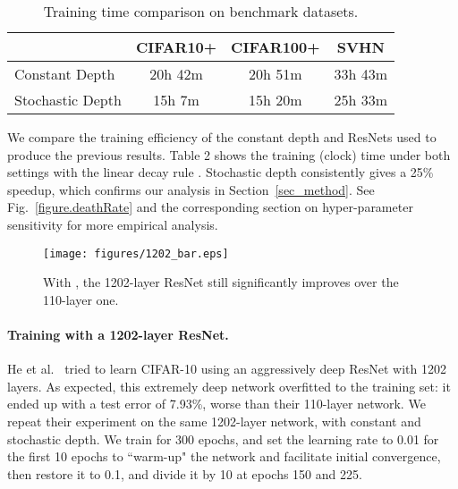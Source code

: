 \documentclass[runningheads]{llncs}
\begin{document}
\begin{table}[t!]
\label{table.training_time}
\caption{Training time comparison on benchmark datasets.}
\begin{center}
\resizebox{0.65\textwidth}{!}
{
\begin{small}
\begin{tabular}{lccc}
\hline
		  	& CIFAR10+   & CIFAR100+   & SVHN	\\
\hline
Constant Depth		
		    & 20h 42m    & 20h 51m	   & 33h 43m \\
Stochastic Depth
			& 15h 7m	 & 15h 20m	   & 25h 33m \\
\hline
\end{tabular}
\end{small}
}
\vspace{-5ex}
\end{center}
\end{table}  We compare the training efficiency of the constant depth and \name{} ResNets used to produce the previous results. Table 2 shows the training (clock) time under both settings with the linear decay rule . Stochastic depth consistently gives a 25\% speedup, which confirms our analysis in Section~\ref{sec_method}. See Fig.~\ref{figure.deathRate} and the corresponding section on hyper-parameter sensitivity for more empirical analysis. 

\begin{wrapfigure}{r}{0.5\textwidth}
	\vspace{-15ex}
	\begin{center}
		\texttt{[image: figures/1202\_bar.eps]}
	\end{center}
	\vspace{-10ex}
	\caption{With \name{}, the 1202-layer ResNet still significantly improves over the 110-layer one.}
	\vspace{-4ex}
	\label{figure.1202compare}
\end{wrapfigure}

\paragraph{\textbf{Training with a 1202-layer ResNet.}}
He et al.~\cite{he2015deep} tried to learn CIFAR-10 using an aggressively deep ResNet with 1202 layers. As expected, this extremely deep network overfitted to the training set: it ended up with a test error of 7.93\%, worse than their 110-layer network. We repeat their experiment on the same 1202-layer network, with constant and stochastic depth. We train for 300 epochs, and set the learning rate to 0.01 for the first 10 epochs to ``warm-up" the network and facilitate initial convergence, then restore it to 0.1, and divide it by 10 at epochs 150 and 225.
\end{document}
